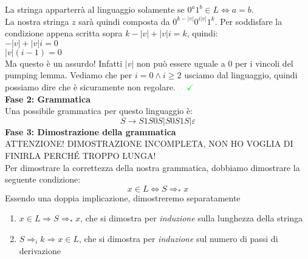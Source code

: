 \documentclass[a4paper,oneside]{scrbook}
\newcommand{\greenmark}{\quad \textcolor{green}{\checkmark}}
\begin{document}
La stringa apparterrà al linguaggio solamente se $0^a1^b\in L \Leftrightarrow a=b$.\\
La nostra stringa $z$ sarà quindi composta da $0^{k-|v|}0^{i|v|}1^k$. Per soddisfare la condizione appena scritta sopra $k-|v|+|v|i=k$, quindi:\\
$-|v|+|v|i=0$\\
$|v|(i-1)=0$\\
Ma questo è un assurdo! Infatti $|v|$ non può essere uguale a $0$ per i vincoli del pumping lemma.
Vediamo che per $i=0 \wedge i\geq2$ usciamo dal linguaggio, quindi possiamo dire che è sicuramente non regolare. $\greenmark$\\
\textbf{Fase 2: Grammatica}\\
Una possibile grammatica per questo linguaggio è:
$$S \rightarrow S1S0S|S0S1S|\varepsilon$$
\textbf{Fase 3: Dimostrazione della grammatica}\\
{\LARGE ATTENZIONE! DIMOSTRAZIONE INCOMPLETA, NON HO VOGLIA DI FINIRLA PERCHÉ TROPPO LUNGA!}\\
Per dimostrare la correttezza della nostra grammatica, dobbiamo dimostrare la seguente condizione:
$$x\in L \Leftrightarrow S \Rightarrow_* x$$
Essendo una doppia implicazione, dimostreremo separatamente
\begin{enumerate}
	\item $x\in L \Rightarrow S \Rightarrow_* x $, che si dimostra per \textit{induzione} sulla lunghezza della stringa
	\item $ S \Rightarrow_i k \Rightarrow x \in L$, che si dimostra per \textit{induzione} sul numero di passi di derivazione
\end{enumerate}
\end{document}
